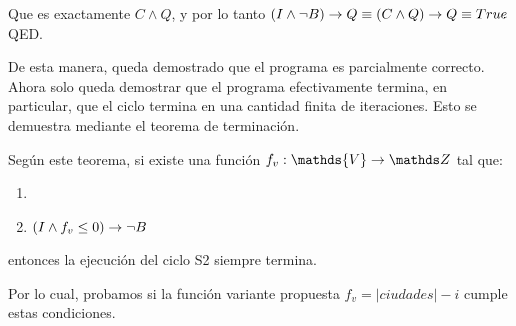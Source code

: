 \documentclass[10pt,a4paper]{article}
\begin{document}
Que es exactamente $C \land Q$, y por lo tanto $(I \land \neg B) \rightarrow Q \equiv (C \land Q) \rightarrow Q \equiv True$ QED.
\bigskip

De esta manera, queda demostrado que el programa es parcialmente correcto. Ahora solo queda demostrar que el programa efectivamente termina, en particular, que el ciclo termina en una cantidad finita de iteraciones. Esto se demuestra mediante el teorema de terminación.
\bigskip

Según este teorema, si existe una función $f_v: \mathds{V} \to \ent$ tal que:

\begin{enumerate}
	\item {}
	\item $(I \land f_v \leq 0) \rightarrow \neg B$
\end{enumerate}

entonces la ejecución del ciclo S2 siempre termina.
\bigskip

Por lo cual, probamos si la función variante propuesta $f_v = |ciudades| - i$ cumple estas condiciones.
\bigskip
\end{document}
